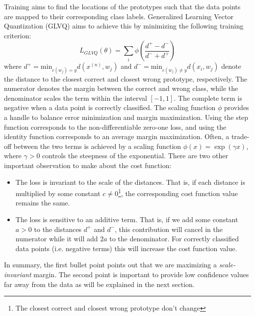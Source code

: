 \documentclass{article} %
\begin{document}
Training aims to find the locations of the prototypes such that the data points are mapped to their corresponding class labels. Generalized Learning Vector Quantization (GLVQ) \cite{sato1996generalized} aims to achieve this by minimizing the following training criterion:
\begin{equation}
 L_{GLVQ}(\theta) = \sum_i \phi\left(\frac{d^+ - d^-}{d^- + d^+}\right)
\end{equation}
where $d^+ = \mbox{min}_{c(w_j) = y} d(x^{(n)}, w_j)$ and $d^- = \mbox{min}_{c(w_j)\neq y} d(x_i, w_j)$ denote the distance to the closest correct and closest wrong prototype, respectively. The numerator denotes the margin between the correct and wrong class, while the denominator scales the term within the interval $[-1, 1]$. The complete term is negative when a data point is correctly classified. The scaling function $\phi$ provides a handle to balance error minimization and margin maximization. Using the step function corresponds to the non-differentiable zero-one loss, and using the identity function corresponds to an average margin maximization. Often, a trade-off between the two terms is achieved by a scaling function $\phi(x) = \exp(\gamma x)$, where $\gamma > 0$ controls the steepness of the exponential. 
There are two other important observation to make about the cost function: 
\begin{itemize}
\item The loss is invariant to the scale of the distances. That is, if each distance is multiplied by some constant $c \neq 0$\footnote{The closest correct and closest wrong prototype don't change}, the corresponding cost function value remains the same. 
\item The loss is sensitive to an additive term. That is, if we add some constant $a > 0$ to the distances $d^+$ and $d^-$, this contribution will cancel in the numerator while it will add $2a$ to the denominator. For correctly classified data points (i.e. negative terms) this will increase the cost function value.          
\end{itemize} 
In summary, the first bullet point points out that we are maximizing a \emph{scale-invariant} margin. The second point is important to provide low confidence values far away from the data as will be explained in the next section. 
\end{document}
